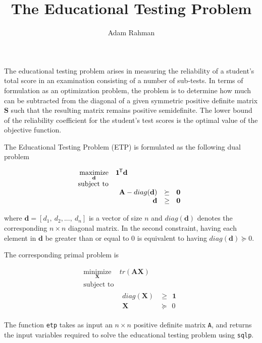 \documentclass{article}
\author{Adam Rahman}
\title{The Educational Testing Problem}
\newcommand{\ve}[1]{\mathbf{#1}}           %
\newcommand{\m}[1]{\mathbf{#1}}               %
\newcommand{\tr}[1]{{#1}^{\mkern-1.5mu\mathsf{T}}}              %
\begin{document}
\maketitle

The educational testing problem arises in measuring the reliability of a student's total score in an examination consisting of a number of sub-tests\cite{fletcher1981nonlinear}. In terms of formulation as an optimization problem, the problem is to determine how much can be subtracted from the diagonal of a given symmetric positive definite matrix $\m{S}$ such that the resulting matrix remains positive semidefinite\cite{chu1995educational}. The lower bound of the reliability coefficient for the student's test scores is the optimal value of the objective function.

The Educational Testing Problem (ETP) is formulated as the following dual problem

\[
\begin{array}{rl}
\underset{\ve{d}}{\text{maximize}} & \tr{\ve{1}}\ve{d} \\
\text{subject to} & \\
& \begin{array}{rl}
\m{A} - diag(\ve{d}) &\succeq~~ \ve{0} \\
\ve{d} &\geq~~ \ve{0}
\end{array}
\end{array}
\]

\noindent where $\ve{d} = [d_{1},~d_{2},...,~d_{n}]$ is a vector of size $n$ and $diag(\ve{d})$ denotes the corresponding $n \times n$ diagonal matrix. In the second constraint, having each element in $\ve{d}$ be greater than or equal to 0 is equivalent to having $diag(\ve{d}) \succeq 0$. 

The corresponding primal problem is

\[
\begin{array}{rl}
\underset{\m{X}}{\text{minimize}} & tr(\m{A}\m{X}) \\
\text{subject to} & \\
& \begin{array}{rl}
diag(\m{X}) &\geq~~ \ve{1} \\
\m{X} &\succeq~~ 0
\end{array}
\end{array}
\]

The function \verb!etp! takes as input an $n \times n$ positive definite matrix \verb!A!, and returns the input variables required to solve the educational testing problem using \verb!sqlp!.
\end{document}
